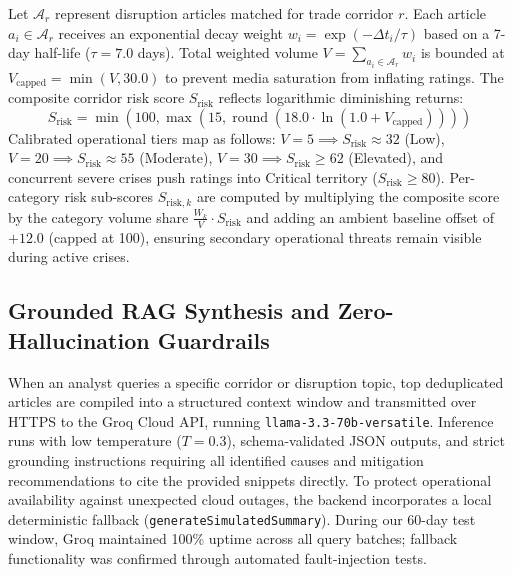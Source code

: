 \documentclass[conference]{IEEEtran}
\begin{document}
Let $\mathcal{A}_r$ represent disruption articles matched for trade corridor $r$. Each article $a_i \in \mathcal{A}_r$ receives an exponential decay weight $w_i = \exp(-\Delta t_i / \tau)$ based on a 7-day half-life ($\tau = 7.0$ days). Total weighted volume $V = \sum_{a_i \in \mathcal{A}_r} w_i$ is bounded at $V_{\text{capped}} = \min(V, 30.0)$ to prevent media saturation from inflating ratings. The composite corridor risk score $S_{\text{risk}}$ reflects logarithmic diminishing returns:
\begin{equation}
    S_{\text{risk}} = \min\left(100, \max\left(15, \operatorname{round}\left(18.0 \cdot \ln(1.0 + V_{\text{capped}})\right)\right)\right)
    \label{eq:risk}
\end{equation}
Calibrated operational tiers map as follows: $V = 5 \implies S_{\text{risk}} \approx 32$ (Low), $V = 20 \implies S_{\text{risk}} \approx 55$ (Moderate), $V = 30 \implies S_{\text{risk}} \ge 62$ (Elevated), and concurrent severe crises push ratings into Critical territory ($S_{\text{risk}} \ge 80$). Per-category risk sub-scores $S_{\text{risk}, k}$ are computed by multiplying the composite score by the category volume share $\frac{W_k}{V} \cdot S_{\text{risk}}$ and adding an ambient baseline offset of $+12.0$ (capped at 100), ensuring secondary operational threats remain visible during active crises.

\subsection{Grounded RAG Synthesis and Zero-Hallucination Guardrails}
When an analyst queries a specific corridor or disruption topic, top deduplicated articles are compiled into a structured context window and transmitted over HTTPS to the Groq Cloud API, running \texttt{llama-3.3-70b-versatile}. Inference runs with low temperature ($T = 0.3$), schema-validated JSON outputs, and strict grounding instructions requiring all identified causes and mitigation recommendations to cite the provided snippets directly. To protect operational availability against unexpected cloud outages, the backend incorporates a local deterministic fallback (\texttt{generateSimulatedSummary}). During our 60-day test window, Groq maintained 100\% uptime across all query batches; fallback functionality was confirmed through automated fault-injection tests.

\end{document}
